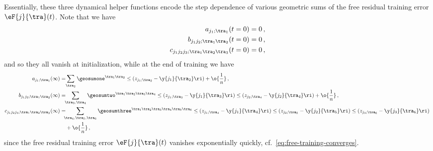 Essentially, these three dynamical helper functions encode the step dependence of various geometric sums of the free residual training error $\eF{j}{\tra}(t)$.
Note that we have
\begin{align}
a_{j_1;\tra_1}(t=0) &= 0 \, ,\label{eq:a-init-vanish}\\
b_{j_1j_2;\tra_1\tra_2}(t=0) &=0 \, ,\label{eq:b-init-vanish}\\
c_{j_1j_2j_3;\tra_1\tra_2\tra_3}(t=0) &=0 \, ,\label{eq:c-init-vanish}
\end{align}
and so they all vanish at initialization, while at the end of training we have
\begin{align}
a_{j_1;\tra_1}(\infty) =&\!\sum_{\tra_2}\geosumone^{\tra_1\tra_2}\le(z_{j_1;\tra_2}-\y{j_1}{\tra_2}\ri)+\o{\frac{1}{n}} \, ,\label{eq:a-end}\\
b_{j_1j_2;\tra_1\tra_2}(\infty) =&\!\!\sum_{\tra_3,\tra_4}\geosumtwo^{\tra_1\tra_2\tra_3\tra_4}\le(z_{j_1;\tra_3}-\y{j_1}{\tra_3}\ri)\le(z_{j_2;\tra_4}-\y{j_2}{\tra_4}\ri)+\o{\frac{1}{n}} \, ,\label{eq:b-end}\\
c_{j_1j_2j_3;\tra_1\tra_2\tra_3}(\infty) =&\!\!\!\sum_{\tra_4,\tra_5,\tra_6}\geosumthree^{\tra_1\tra_2\tra_3\tra_4\tra_5\tra_6}\le(z_{j_1;\tra_4}-\y{j_1}{\tra_4}\ri)\le(z_{j_2;\tra_5}-\y{j_2}{\tra_5}\ri)\le(z_{j_3;\tra_6}-\y{j_3}{\tra_6}\ri)\,\notag\\
&+\o{\frac{1}{n}}\, ,\label{eq:c-end}
\end{align}
since the free residual training error  $\eF{j}{\tra}(t)$ vanishes exponentially quickly, cf.~\eqref{eq:free-training-converges}.


